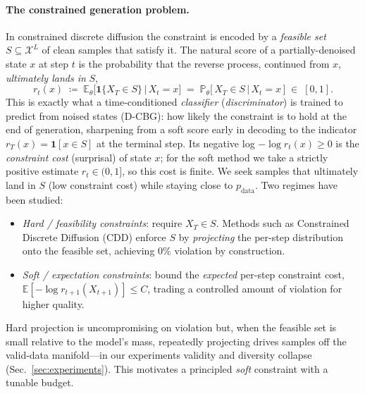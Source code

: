 \documentclass{article}
\newcommand{\E}{\mathbb{E}}
\newcommand{\X}{\mathcal{X}}
\begin{document}
\paragraph{The constrained generation problem.} In constrained discrete diffusion the constraint is encoded by a \emph{feasible set} $S\subseteq\X^L$ of clean samples that satisfy it. The natural score of a partially-denoised state $x$ at step $t$ is the probability that the reverse process, continued from $x$, \emph{ultimately lands in} $S$,
\begin{equation}
\label{eq:rscore}
r_t(x)\;\coloneqq\;\E_\theta\!\big[\mathbf 1\{X_T\in S\}\,\big|\,X_t=x\big]
\;=\;\mathbb P_\theta\!\big[\,X_T\in S \,\big|\, X_t=x\,\big]\;\in\;[0,1].
\end{equation}
This is exactly what a time-conditioned \emph{classifier} (\emph{discriminator}) is trained to predict from noised states (D-CBG): how likely the constraint is to hold at the end of generation, sharpening from a soft score early in decoding to the indicator $r_T(x)=\mathbf 1[x\in S]$ at the terminal step. Its negative log $-\log r_t(x)\ge0$ is the \emph{constraint cost} (surprisal) of state $x$; for the soft method we take a strictly positive estimate $r_t\in(0,1]$, so this cost is finite. We seek samples that ultimately land in $S$ (low constraint cost) while staying close to $p_{\mathrm{data}}$. Two regimes have been studied:
\begin{itemize}
\item \emph{Hard / feasibility constraints}: require $X_T\in S$. Methods such as Constrained Discrete Diffusion (CDD) \cite{cardei2025cdd} enforce $S$ by \emph{projecting} the per-step distribution onto the feasible set, achieving $0\%$ violation by construction.
\item \emph{Soft / expectation constraints}: bound the \emph{expected} per-step constraint cost, $\E[-\log r_{t+1}(X_{t+1})]\le C$, trading a controlled amount of violation for higher quality.
\end{itemize}
Hard projection is uncompromising on violation but, when the feasible set is small relative to the model's mass, repeatedly projecting drives samples off the valid-data manifold---in our experiments validity and diversity collapse (Sec.~\ref{sec:experiments}). This motivates a principled \emph{soft} constraint with a tunable budget.
\end{document}
